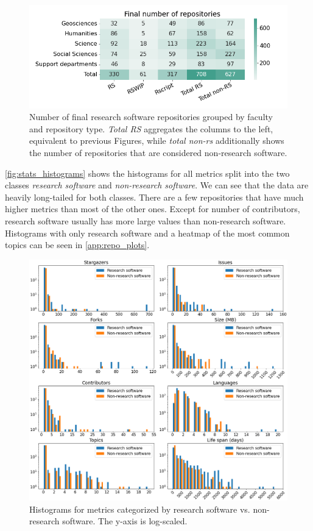 \begin{figure}[h!]
\centerline{
\includegraphics[scale=0.48]{figures_results/heatmap_repo_count_final.png}}
\vspace{-0.3cm}
\caption{Number of final research software repositories grouped by faculty and repository type. \textit{Total RS} aggregates the columns to the left, equivalent to previous Figures, while \textit{total non-rs} additionally shows the number of repositories that are considered non-research software. 
\label{fig:heat_repo_count_final}}
\end{figure}

\newpage

\autoref{fig:stats_histograms} shows the histograms for all metrics split into the two classes \textit{research software} and \textit{non-research software}. We can see that the data are heavily long-tailed for both classes. There are a few repositories that have much higher metrics than most of the other ones. Except for number of contributors, research software usually has more large values than non-research software. 
Histograms with only research software and a heatmap of the most common topics can be seen in \autoref{app:repo_plots}.


\begin{figure}[h!]
\centerline{
\includegraphics[scale=0.54]{figures_results/stats_histograms.png}}
\caption{Histograms for metrics categorized by research software vs. non-research software. The y-axis is log-scaled.
\label{fig:stats_histograms}}
\end{figure}

